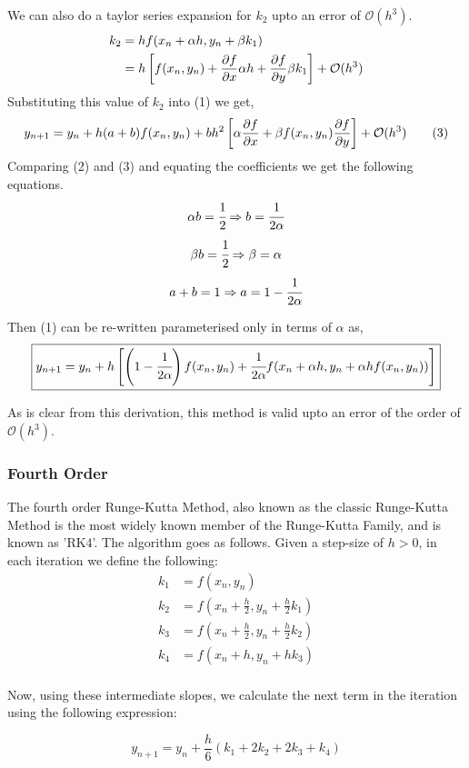 \documentclass{scrartcl}
\newcommand{\bigO}{\mathcal{O}}
\begin{document}
We can also do a taylor series expansion for $k_2$ upto an error of $\bigO(h^3)$.
\begin{align*}
    k_2 &= hf(x_n + \alpha h, y_n + \beta k_1) \\ 
        &= h\left[ f(x_n, y_n) + \pdv{f}{x}\alpha h + \pdv{f}{y}\beta k_1 \right] + \bigO(h^3) \\ 
\end{align*}
Substituting this value of $k_2$ into (1) we get, 
\begin{align*}
    y_{n+1} = y_n + h(a + b)f(x_n, y_n) + bh^2\left[ \alpha \pdv{f}{x} + \beta f(x_n, y_n) \pdv{f}{y} \right] + \bigO(h^3) \tag{3}
\end{align*}
Comparing (2) and (3) and equating the coefficients we get the following equations.
$$\alpha b = \cfrac{1}{2} \Rightarrow b = \cfrac{1}{2\alpha}$$
$$\beta b = \cfrac{1}{2} \Rightarrow \beta = \alpha$$
$$a + b = 1 \Rightarrow a = 1 - \cfrac{1}{2\alpha}$$

Then (1) can be re-written parameterised only in terms of $\alpha$ as,
$$\boxed{y_{n+1} = y_n + h\left[\left(1 - \cfrac{1}{2\alpha}\right)f(x_n, y_n) + \cfrac{1}{2\alpha}f(x_n + \alpha h, y_n + \alpha hf(x_n, y_n))\right]}$$

As is clear from this derivation, this method is valid upto an error of the order of $\bigO(h^3)$.

\subsubsection{Fourth Order}
The fourth order Runge-Kutta Method, also known as the classic Runge-Kutta Method is the most widely known member of the Runge-Kutta Family, and is known as 'RK4'. The algorithm goes as follows. Given a step-size of $h > 0$, in each iteration we define the following:
\begin{align*}
    k_1 &= f(x_n, y_n) \\    
    k_2 &= f\left(x_n + \frac{h}{2}, y_n + \frac{h}{2}k_1\right) \\
    k_3 &= f\left(x_n + \frac{h}{2}, y_n + \frac{h}{2}k_2\right) \\
    k_4 &= f\left(x_n + h, y_n + hk_3\right) \\
\end{align*}

Now, using these intermediate slopes, we calculate the next term in the iteration using the following expression:

$$\boxed{y_{n + 1} = y_n + \frac{h}{6}(k_1 + 2k_2 + 2k_3 + k_4)}$$
\end{document}
